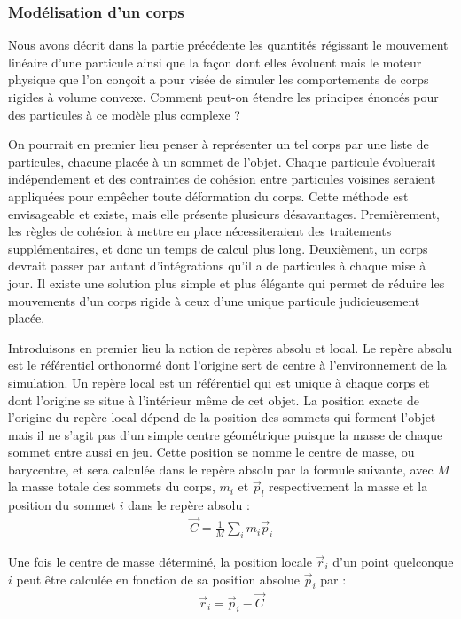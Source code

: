 \subsubsection{Modélisation d'un corps}

Nous avons décrit dans la partie précédente les quantités régissant le
mouvement linéaire d'une particule ainsi que la façon dont elles
évoluent mais le moteur physique que l'on conçoit a pour visée de
simuler les comportements de corps rigides à volume convexe. Comment
peut-on étendre les principes énoncés pour des particules à ce modèle
plus complexe ?

On pourrait en premier lieu penser à représenter un tel corps par une
liste de particules, chacune placée à un sommet de l'objet. Chaque
particule évoluerait indépendement et des contraintes de cohésion
entre particules voisines seraient appliquées pour empêcher toute
déformation du corps. Cette méthode est envisageable et existe, mais
elle présente plusieurs désavantages. Premièrement, les règles de
cohésion à mettre en place nécessiteraient des traitements
supplémentaires, et donc un temps de calcul plus long. Deuxièment, un
corps devrait passer par autant d'intégrations qu'il a de particules à
chaque mise à jour. Il existe une solution plus simple et plus
élégante qui permet de réduire les mouvements d'un corps rigide à ceux
d'une unique particule judicieusement placée.

Introduisons en premier lieu la notion de repères absolu et local. Le
repère absolu est le référentiel orthonormé dont l'origine sert de
centre à l'environnement de la simulation. Un repère local est un
référentiel qui est unique à chaque corps et dont l'origine se situe à
l'intérieur même de cet objet. La position exacte de l'origine du
repère local dépend de la position des sommets qui forment l'objet
mais il ne s'agit pas d'un simple centre géométrique puisque la masse
de chaque sommet entre aussi en jeu. Cette position se nomme le centre
de masse, ou barycentre, et sera calculée dans le repère absolu par la
formule suivante, avec $M$ la masse totale des sommets du corps, $m_i$
et $\vec{p}_l$ respectivement la masse et la position du sommet $i$
dans le repère absolu :
\begin{align*}
  \vec{C} = \frac{1}{M} \sum_i m_i \vec{p}_i
\end{align*}

Une fois le centre de masse déterminé, la position locale $\vec{r}_i$
d'un point quelconque $i$ peut être calculée en fonction de sa
position absolue $\vec{p}_i$ par :
\begin{align*}
  \vec{r}_i = \vec{p}_i - \vec{C}
\end{align*}

